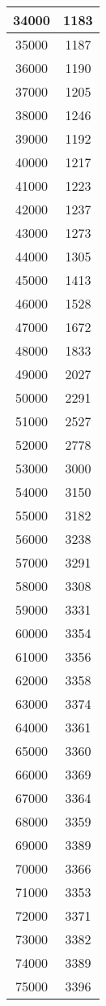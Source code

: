 \documentclass[ngerman,a4paper]{report}
\begin{document}
\begin{tabular}{|c|c|}
34000 & 1183\\
\hline
35000 & 1187\\
\hline
36000 & 1190\\
\hline
37000 & 1205\\
\hline
38000 & 1246\\
\hline
39000 & 1192\\
\hline
40000 & 1217\\
\hline
41000 & 1223\\
\hline
42000 & 1237\\
\hline
43000 & 1273\\
\hline
44000 & 1305\\
\hline
45000 & 1413\\
\hline
46000 & 1528\\
\hline
47000 & 1672\\
\hline
48000 & 1833\\
\hline
49000 & 2027\\
\hline
50000 & 2291\\
\hline
51000 & 2527\\
\hline
52000 & 2778\\
\hline
53000 & 3000\\
\hline
54000 & 3150\\
\hline
55000 & 3182\\
\hline
56000 & 3238\\
\hline
57000 & 3291\\
\hline
58000 & 3308\\
\hline
59000 & 3331\\
\hline
60000 & 3354\\
\hline
61000 & 3356\\
\hline
62000 & 3358\\
\hline
63000 & 3374\\
\hline
64000 & 3361\\
\hline
65000 & 3360\\
\hline
66000 & 3369\\
\hline
67000 & 3364\\
\hline
68000 & 3359\\
\hline
69000 & 3389\\
\hline
70000 & 3366\\
\hline
71000 & 3353\\
\hline
72000 & 3371\\
\hline
73000 & 3382\\
\hline
74000 & 3389\\
\hline
75000 & 3396\\
\hline

\end{tabular}
\end{document}
